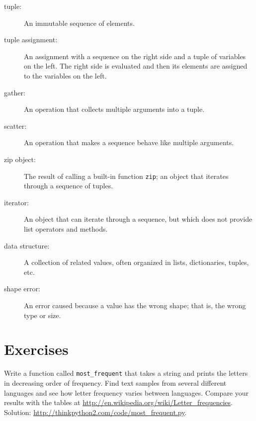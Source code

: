 \documentclass[10pt]{book}
\begin{document}
\begin{description}

\item[tuple:] An immutable sequence of elements.

\item[tuple assignment:] An assignment with a sequence on the
right side and a tuple of variables on the left.  The right
side is evaluated and then its elements are assigned to the
variables on the left.

\item[gather:] An operation that collects multiple arguments into a tuple.

\item[scatter:] An operation that makes a sequence behave like multiple arguments.

\item[zip object:] The result of calling a built-in function {\tt zip};
an object that iterates through a sequence of tuples.

\item[iterator:] An object that can iterate through a sequence, but
which does not provide list operators and methods.

\item[data structure:] A collection of related values, often
organized in lists, dictionaries, tuples, etc.

\item[shape error:] An error caused because a value has the
wrong shape; that is, the wrong type or size.

\end{description}


\section{Exercises}

\begin{exercise}

Write a function called \verb"most_frequent" that takes a string and
prints the letters in decreasing order of frequency.  Find text
samples from several different languages and see how letter frequency
varies between languages.  Compare your results with the tables at
\url{http://en.wikipedia.org/wiki/Letter_frequencies}.  Solution:
\url{http://thinkpython2.com/code/most_frequent.py}.   

\end{exercise}
\end{document}
